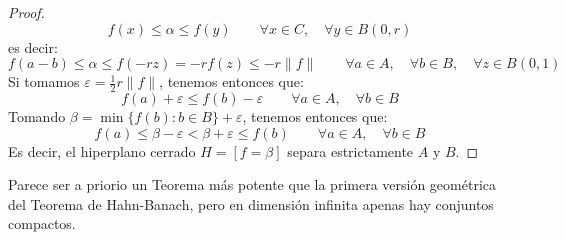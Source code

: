 \begin{teo}
\begin{proof}
        \begin{equation*}
            f(x) \leq \alpha \leq f(y) \qquad \forall x\in C, \quad \forall y\in B(0,r)
        \end{equation*}
        es decir:
        \begin{equation*}
            f(a-b) \leq \alpha \leq f(-rz) = -rf(z) \leq -r\|f\| \qquad \forall a\in A, \quad \forall b\in B, \quad \forall z\in B(0,1)
        \end{equation*}
        Si tomamos $\varepsilon=\frac{1}{2}r\|f\|$, tenemos entonces que:
        \begin{equation*}
            f(a) + \varepsilon\leq f(b) - \varepsilon\qquad \forall a\in A, \quad \forall b\in B
        \end{equation*}
        Tomando $\beta = \min\{f(b) : b\in B\}+\varepsilon$, tenemos entonces que:
        \begin{equation*}
            f(a) \leq \beta - \varepsilon < \beta + \varepsilon \leq f(b) \qquad \forall a\in A, \quad \forall b\in B
        \end{equation*}
        Es decir, el hiperplano cerrado $H=[f=\beta]$ separa estrictamente $A$ y $B$.
    \end{proof}
\end{teo}

\noindent
Parece ser a priorio un Teorema más potente que la primera versión geométrica del Teorema de Hahn-Banach, pero en dimensión infinita apenas hay conjuntos compactos.

